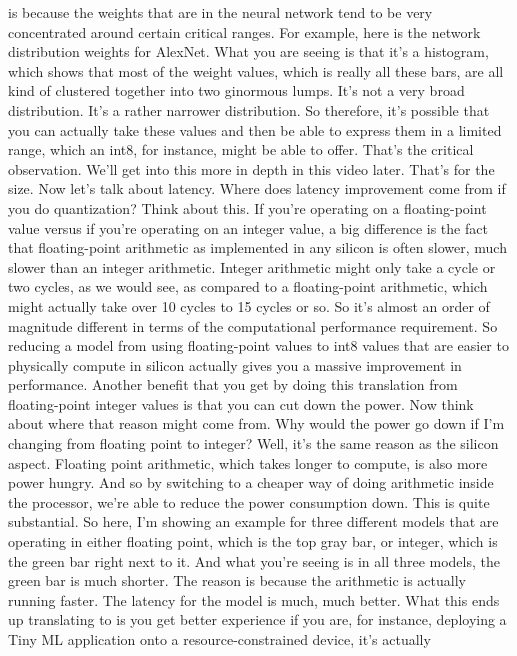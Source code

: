 is because the weights that are in the neural network
tend to be very concentrated around certain critical ranges.
For example, here is the network distribution weights for AlexNet.
What you are seeing is that it's a histogram, which
shows that most of the weight values, which is really all these bars,
are all kind of clustered together into two ginormous lumps.
It's not a very broad distribution.
It's a rather narrower distribution.
So therefore, it's possible that you can actually take these values
and then be able to express them in a limited range, which
an int8, for instance, might be able to offer.
That's the critical observation.
We'll get into this more in depth in this video later.
That's for the size.
Now let's talk about latency.
Where does latency improvement come from if you do quantization?
Think about this.
If you're operating on a floating-point value versus if you're
operating on an integer value, a big difference
is the fact that floating-point arithmetic
as implemented in any silicon is often slower, much slower than an integer
arithmetic.
Integer arithmetic might only take a cycle or two cycles,
as we would see, as compared to a floating-point arithmetic, which
might actually take over 10 cycles to 15 cycles or so.
So it's almost an order of magnitude different in terms
of the computational performance requirement.
So reducing a model from using floating-point values
to int8 values that are easier to physically compute in silicon actually
gives you a massive improvement in performance.
Another benefit that you get by doing this translation
from floating-point integer values is that you can cut down the power.
Now think about where that reason might come from.
Why would the power go down if I'm changing
from floating point to integer?
Well, it's the same reason as the silicon aspect.
Floating point arithmetic, which takes longer to compute,
is also more power hungry.
And so by switching to a cheaper way of doing arithmetic inside the processor,
we're able to reduce the power consumption down.
This is quite substantial.
So here, I'm showing an example for three different models that
are operating in either floating point, which is the top gray bar,
or integer, which is the green bar right next to it.
And what you're seeing is in all three models, the green bar is much shorter.
The reason is because the arithmetic is actually running faster.
The latency for the model is much, much better.
What this ends up translating to is you get better experience if you are,
for instance, deploying a Tiny ML application
onto a resource-constrained device, it's actually
